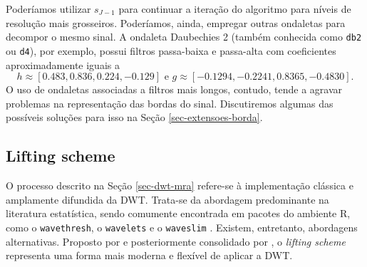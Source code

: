 Poderíamos utilizar \(s_{J - 1}\) para continuar a iteração do algoritmo para níveis de resolução mais grosseiros. 
Poderíamos, ainda, empregar outras ondaletas para decompor o mesmo sinal. 
A ondaleta Daubechies 2 (também conhecida como \texttt{db2} ou \texttt{d4}), por exemplo, possui filtros passa-baixa e passa-alta com coeficientes aproximadamente iguais a
\[
	h \approx [0.483, 0.836, 0.224, -0.129] \text{ e } g \approx [-0.1294, -0.2241, 0.8365, -0.4830].
\]
O uso de ondaletas associadas a filtros mais longos, contudo, tende a agravar problemas na representação das bordas do sinal. 
Discutiremos algumas das possíveis soluções para isso na Seção \ref{sec-extensoes-borda}.

\subsection{Lifting scheme}\label{sec-lifting-scheme}
O processo descrito na Seção \ref{sec-dwt-mra} refere-se à implementação clássica e amplamente difundida da DWT. 
Trata-se da abordagem predominante na literatura estatística, sendo comumente encontrada em pacotes do ambiente R, como o \texttt{wavethresh}, o \texttt{wavelets} e o \texttt{waveslim} \cite{nason_wavethresh_1999, aldrich_wavelets_2005, brandon_whitcher_waveslim_2001}. 
Existem, entretanto, abordagens alternativas. 
Proposto por  e posteriormente consolidado por , o \emph{lifting scheme} representa uma forma mais moderna e flexível de aplicar a DWT.

